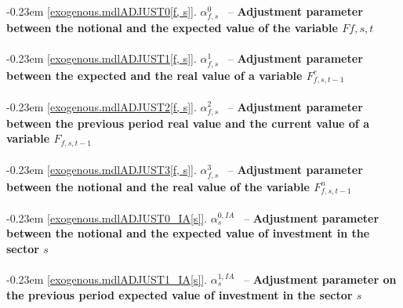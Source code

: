 \documentclass[12pt]{article}
\numberwithin{equation}{section}
\begin{document}
\noindent \kern-0.23em \noindent \begingroup {} \label{exogenous.mdlADJUST0[f, s]}\ref{exogenous.mdlADJUST0[f, s]}.
         
        \ensuremath{\alpha^{{0}}_{f, s}}~ \endgroup -- \noindent \textbf{Adjustment parameter between the notional and the expected value of the variable $F{f,s,t}$}  \\ \\[-8pt]


\noindent \kern-0.23em \noindent \begingroup {} \label{exogenous.mdlADJUST1[f, s]}\ref{exogenous.mdlADJUST1[f, s]}.
         
        \ensuremath{\alpha^{{1}}_{f, s}}~ \endgroup -- \noindent \textbf{Adjustment parameter between the expected and the real value of a variable $F^{e}_{f,s,t-1}$}  \\ \\[-8pt]


\noindent \kern-0.23em \noindent \begingroup {} \label{exogenous.mdlADJUST2[f, s]}\ref{exogenous.mdlADJUST2[f, s]}.
         
        \ensuremath{\alpha^{{2}}_{f, s}}~ \endgroup -- \noindent \textbf{Adjustment parameter between the previous period real value and the current value of a variable $F_{f,s,t-1}$}  \\ \\[-8pt]


\noindent \kern-0.23em \noindent \begingroup {} \label{exogenous.mdlADJUST3[f, s]}\ref{exogenous.mdlADJUST3[f, s]}.
         
        \ensuremath{\alpha^{{3}}_{f, s}}~ \endgroup -- \noindent \textbf{Adjustment parameter between the notional and the real value of the variable $F^{n}_{f,s,t-1}$}  \\ \\[-8pt]


\noindent \kern-0.23em \noindent \begingroup {} \label{exogenous.mdlADJUST0_IA[s]}\ref{exogenous.mdlADJUST0_IA[s]}.
         
        \ensuremath{\alpha^{{0},IA}_{s}}~ \endgroup -- \noindent \textbf{Adjustment parameter between the notional and the  expected value of investment in the sector $s$}  \\ \\[-8pt]


\noindent \kern-0.23em \noindent \begingroup {} \label{exogenous.mdlADJUST1_IA[s]}\ref{exogenous.mdlADJUST1_IA[s]}.
         
        \ensuremath{\alpha^{{1},IA}_{s}}~ \endgroup -- \noindent \textbf{Adjustment parameter on the previous period expected value of investment in the sector $s$}  \\ \\[-8pt]
\end{document}
